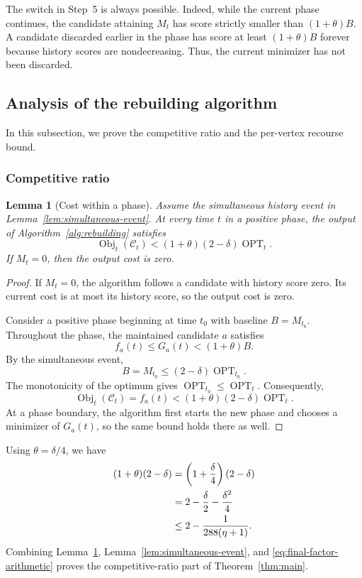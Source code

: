 \documentclass[11pt]{article}
\newtheorem{lemma}[theorem]{Lemma}
\theoremstyle{definition}
\theoremstyle{remark}
\newcommand{\C}{\mathcal C}
\newcommand{\OPT}{\operatorname{OPT}}
\newcommand{\Obj}{\operatorname{Obj}}
\newcommand{\1}{\mathbf 1}
\begin{document}
The switch in Step~5 is always possible.  Indeed, while the current phase
continues, the candidate attaining $M_t$ has score strictly smaller than
$(1+\theta)B$.  A candidate discarded earlier in the phase has score at
least $(1+\theta)B$ forever because history scores are nondecreasing.  Thus,
the current minimizer has not been discarded.

\subsection{Analysis of the rebuilding algorithm}

In this subsection, we prove the competitive ratio and the per-vertex
recourse bound.

\subsubsection{Competitive ratio}

\begin{lemma}[Cost within a phase]\label{lem:phase-cost}
Assume the simultaneous history event in
Lemma~\ref{lem:simultaneous-event}.  At every time $t$ in a positive phase,
the output of Algorithm~\ref{alg:rebuilding} satisfies
\begin{equation}\label{eq:phase-cost-bound}
 \Obj_t(\C_t)
 <(1+\theta)(2-\delta)\OPT_t.
\end{equation}
If $M_t=0$, then the output cost is zero.
\end{lemma}

\begin{proof}
If $M_t=0$, the algorithm follows a candidate with history score zero.
Its current cost is at most its history score, so the output cost is zero.

Consider a positive phase beginning at time $t_0$ with baseline
$B=M_{t_0}$.  Throughout the phase, the maintained candidate $a$ satisfies
\[
 f_a(t)\le G_a(t)<(1+\theta)B.
\]
By the simultaneous event,
\[
 B=M_{t_0}\le(2-\delta)\OPT_{t_0}.
\]
The monotonicity of the optimum gives $\OPT_{t_0}\le\OPT_t$.  Consequently,
\[
 \Obj_t(\C_t)=f_a(t)
 <(1+\theta)(2-\delta)\OPT_t.
\]
At a phase boundary, the algorithm first starts the new phase and chooses a
minimizer of $G_a(t)$, so the same bound holds there as well.
\end{proof}

Using $\theta=\delta/4$, we have
\begin{align}
 (1+\theta)(2-\delta)
 &=\left(1+\frac\delta4\right)(2-\delta)\notag\\
 &=2-\frac\delta2-\frac{\delta^2}{4}\notag\\
 &\le2-\frac{1}{288(\eta+1)}.             \label{eq:final-factor-arithmetic}
\end{align}
Combining Lemma~\ref{lem:phase-cost},
Lemma~\ref{lem:simultaneous-event}, and
\eqref{eq:final-factor-arithmetic} proves the competitive-ratio part of
Theorem~\ref{thm:main}.
\end{document}
